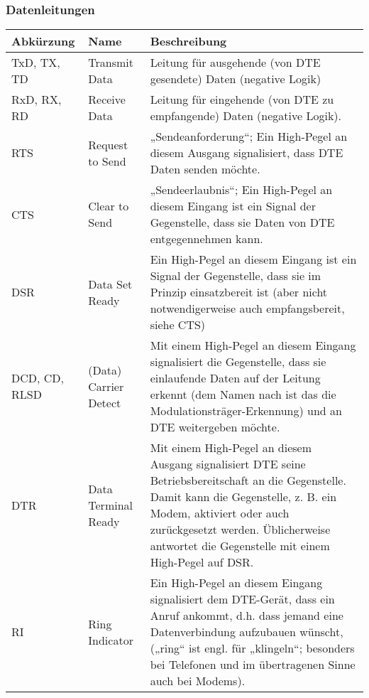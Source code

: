 \subsubsection{Datenleitungen}
\begin{tabular}{|l|l|p{12cm}|}
  \hline
  \textbf{Abkürzung} & \textbf{Name} & \textbf{Beschreibung}\\ \hline
  TxD, TX, TD & Transmit Data & Leitung für ausgehende (von DTE gesendete) Daten
  (negative Logik)\\ 
  \hline
  RxD, RX, RD & Receive Data & Leitung für eingehende (von DTE zu empfangende)
  Daten (negative Logik).\\ 
  \hline
  RTS & Request to Send & „Sendeanforderung“; Ein High-Pegel an diesem Ausgang
  signalisiert, dass DTE Daten senden möchte.\\
  \hline
  CTS & Clear to Send & „Sendeerlaubnis“; Ein High-Pegel an diesem Eingang ist
  ein Signal der Gegenstelle, dass sie Daten von DTE entgegennehmen kann.\\
  \hline
  DSR & Data Set Ready & Ein High-Pegel an diesem Eingang ist ein Signal der
  Gegenstelle, dass sie im Prinzip einsatzbereit ist (aber nicht
  notwendigerweise auch empfangsbereit, siehe CTS)\\
  \hline
  DCD, CD, RLSD & (Data) Carrier Detect & Mit einem High-Pegel an diesem Eingang
  signalisiert die Gegenstelle, dass sie einlaufende Daten auf der Leitung
  erkennt (dem Namen nach ist das die Modulationsträger-Erkennung) und an DTE
  weitergeben möchte.\\
  \hline
  DTR & Data Terminal Ready & Mit einem High-Pegel an diesem Ausgang
  signalisiert DTE seine Betriebsbereitschaft an die Gegenstelle. Damit kann die
  Gegenstelle, z. B. ein Modem, aktiviert oder auch zurückgesetzt werden.
  Üblicherweise antwortet die Gegenstelle mit einem High-Pegel auf DSR.\\
  \hline
  RI & Ring Indicator & Ein High-Pegel an diesem Eingang signalisiert dem
  DTE-Gerät, dass ein Anruf ankommt, d.h. dass jemand eine Datenverbindung
  aufzubauen wünscht, („ring“ ist engl. für „klingeln“; besonders bei Telefonen
  und im übertragenen Sinne auch bei Modems).\\ 
  \hline
  
\end{tabular}